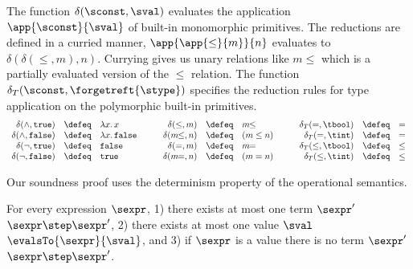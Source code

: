 %
The function $\delta(\sconst, \sval)$ 
evaluates the application $\app{\sconst}{\sval}$ 
of built-in monomorphic primitives.
%
The reductions are defined in a curried 
manner, \ie 
$\app{\app{\leq}{m}}{n}$ evaluates to $\delta(\delta(\leq,m),n)$. 
%
Currying gives us unary relations like $m\!\!\leq$ 
which is a partially evaluated version of the $\leq$ relation.
%
The function $\delta_T(\sconst, \forgetreft{\stype})$
specifies the reduction rules for type 
application on the polymorphic 
built-in primitives. %
%
$$\begin{array}{rclrclrcl}
\delta(\wedge,{\tt true}) & \defeq & \lambda x.\, x &
\delta(\leq,m) & \defeq & m\!\!\leq  & 
    \delta_T(=, \tbool) & \defeq & =  \\
\delta(\wedge,{\tt false}) & \defeq & \lambda x.\, {\tt false}\quad\quad &
\delta(m\!\!\leq, n) & \defeq & {\tt}(m \leq n) \quad\quad&
\delta_T(=, \tint) & \defeq & = \\
\delta(\neg,{\tt true}) & \defeq & {\tt false} & 
\delta(=,m) & \defeq & m\!\!= &
\delta_T(\leq, \tbool) & \defeq & \leq  \\
  \delta(\neg,{\tt false}) & \defeq &  {\tt true} &
  \delta(m\!\!=, n) & \defeq &  {\tt}(m = n) &
  \delta_T(\leq, \tint) & \defeq & \leq  \\
%
\end{array}$$
         



  
%
Our soundness proof  uses the determinism 
property of the operational semantics.
%
\begin{lemma}[Determinism]\label{lem:step-determ}
For every expression $\sexpr$, 
    1) there exists at most one term $\sexpr'$ \suchthat $\sexpr \step \sexpr'$, 
    2) there exists at most one value $\sval$ \suchthat $\evalsTo{\sexpr}{\sval}$, and
    3) if $\sexpr$ is a value there is no term $\sexpr'$ \suchthat $\sexpr \step \sexpr'$.
\end{lemma}    
